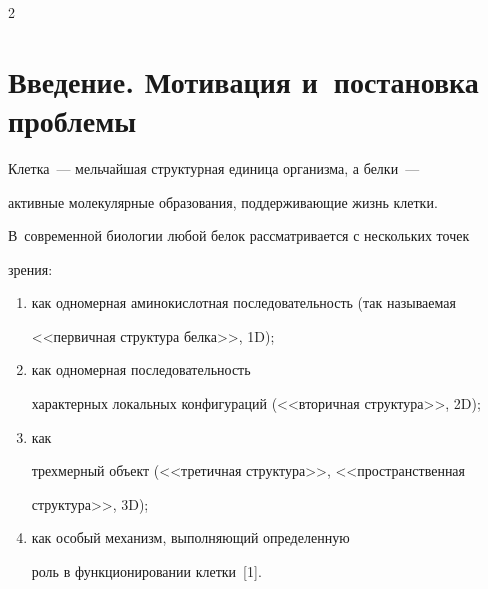 








      \thispagestyle{headings}



      \begin{multicols}{2}



      \label{st\stat}



\section{Введение. Мотивация и~постановка проблемы}



    Клетка~--- мельчайшая структурная единица организма, а белки~--- 

активные молекулярные образования, поддерживающие жизнь клетки. 

В~современной биологии любой белок рассматривается с нескольких точек 

зрения:

\begin{enumerate}[(1)]

\item как одномерная аминокислотная последовательность (так на\-зы\-ва\-емая 

<<первичная структура белка>>, 1D); 

\item как одномерная последовательность 

характерных локальных конфигураций (<<вторичная структура>>, 2D); 

\item как 

трехмерный объект (<<третичная структура>>, <<пространственная 

структура>>, 3D);

\item как особый механизм, выполняющий определенную 

роль в функционировании клет\-ки~[1]. 

\end{enumerate}




\end{multicols}
